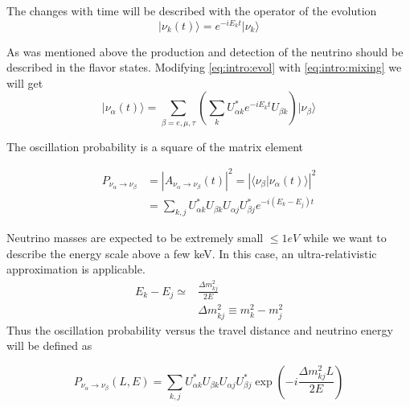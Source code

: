 \documentclass[../main.tex]{subfiles}
\begin{document}
The changes with time will be described with the operator of the evolution
\begin{equation}
\label{eq:intro:evol}
\lvert\nu_k(t)\rangle=e^{-iE_kt}\lvert\nu_k\rangle
\end{equation}

As was mentioned above the production and detection of the neutrino should be described in the flavor states. Modifying \autoref{eq:intro:evol} with \autoref{eq:intro:mixing} we will get
\begin{equation}
\lvert\nu_\alpha(t)\rangle=\sum_{\beta=e, \mu, \tau}\left(\sum_k U^*_{\alpha k}e^{-iE_kt}U_{\beta k} \right)\lvert\nu_\beta\rangle
\end{equation}

The oscillation probability is a square of the matrix element

\begin{align}
P_{\nu_\alpha\to\nu_\beta}&=\left|A_{\nu_\alpha\to\nu_\beta}(t)\right|^2=\left|\langle\nu_\beta\vert\nu_\alpha(t)\rangle\right|^2 \\ \nonumber
{}&=\sum_{k, j}U^*_{\alpha k}U_{\beta k}U_{\alpha j}U^*_{\beta j}e^{-i\left(E_k-E_j\right)t}
\end{align}

Neutrino masses are expected to be extremely small $\leqslant 1eV$ while we want to describe the energy scale above a few keV. In this case, an ultra-relativistic approximation is applicable.
\begin{align}
E_k-E_j \simeq&\frac{\Delta m_{kj}^2}{2E} \\
&\Delta m_{kj}^2 \equiv m^2_k-m^2_j \nonumber
\end{align}
Thus the oscillation probability versus the travel distance and neutrino energy will be defined as

\begin{equation}
P_{\nu_\alpha\to\nu_\beta}(L, E)=\sum_{k, j}U^*_{\alpha k}U_{\beta k}U_{\alpha j}U^*_{\beta j}\exp\left(-i\frac{\Delta m^2_{kj}L}{2E}\right)
\end{equation}
\end{document}

